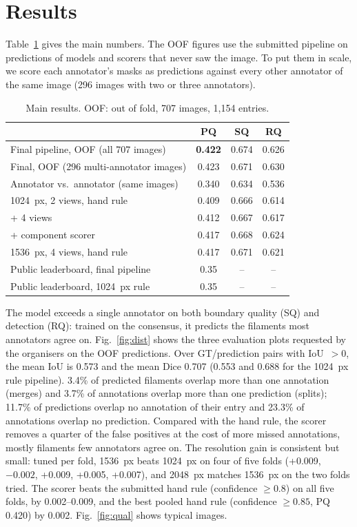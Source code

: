 \documentclass[conference]{IEEEtran}
\begin{document}
\section{Results}
Table~\ref{tab:main} gives the main numbers. The OOF figures use the submitted pipeline on predictions of
models and scorers that never saw the image. To put them in scale, we score each annotator's masks as predictions
against every other annotator of the same image (296 images with two or three annotators).

\begin{table}[t]
\centering
\caption{Main results. OOF: out of fold, 707 images, 1{,}154 entries.}
\label{tab:main}
\small\setlength{\tabcolsep}{3pt}
\begin{tabular}{@{}lccc@{}}
\toprule
 & PQ & SQ & RQ \\
\midrule
Final pipeline, OOF (all 707 images) & \textbf{0.422} & 0.674 & 0.626 \\
Final, OOF (296 multi-annotator images) & 0.423 & 0.671 & 0.630 \\
Annotator vs.\ annotator (same images) & 0.340 & 0.634 & 0.536 \\
\midrule
1024~px, 2 views, hand rule & 0.409 & 0.666 & 0.614 \\
\quad + 4 views & 0.412 & 0.667 & 0.617 \\
\quad + component scorer & 0.417 & 0.668 & 0.624 \\
1536~px, 4 views, hand rule & 0.417 & 0.671 & 0.621 \\
\midrule
Public leaderboard, final pipeline & 0.35 & -- & -- \\
Public leaderboard, 1024~px rule & 0.35 & -- & -- \\
\bottomrule
\end{tabular}
\end{table}

The model exceeds a single annotator on both boundary quality (SQ) and detection (RQ): trained on the
consensus, it predicts the filaments most annotators agree on. Fig.~\ref{fig:dist} shows the three
evaluation plots requested by the organisers on the OOF predictions. Over GT/prediction pairs with
IoU~$>0$, the mean IoU is 0.573 and the mean Dice 0.707 (0.553 and 0.688 for the 1024~px rule pipeline).
3.4\% of predicted filaments overlap more than one annotation (merges) and 3.7\% of annotations overlap
more than one prediction (splits); 11.7\% of predictions overlap no annotation of their entry and 23.3\%
of annotations overlap no prediction. Compared with the hand rule, the scorer removes a quarter of the
false positives at the cost of more missed annotations, mostly filaments few annotators agree on.
The resolution gain is consistent but small: tuned per fold, 1536~px beats 1024~px on four of five folds
(+0.009, $-0.002$, +0.009, +0.005, +0.007), and 2048~px matches 1536~px on the two folds tried. The scorer
beats the submitted hand rule (confidence $\geq 0.8$) on all five folds, by 0.002--0.009, and the best pooled
hand rule (confidence $\geq 0.85$, PQ 0.420) by 0.002. Fig.~\ref{fig:qual} shows typical images.
\end{document}
